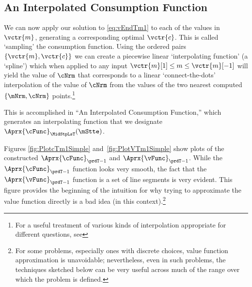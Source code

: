 \documentclass[\econtexRoot/SolvingMicroDSOPs]{subfiles}
\begin{document}


\hypertarget{an-interpolated-consumption-function}{}
\subsection{An Interpolated Consumption Function} \label{subsec:LinInterp}

We can now apply our solution to \eqref{eq:vEndTm1} to each of the values in $\vctr{m}$, generating a corresponding optimal $\vctr{c}$.  This is called `sampling' the consumption function.  Using the ordered pairs $\{\vctr{m},\vctr{c}\}$ we can create a piecewise linear `interpolating function' (a `spline') which when applied to any input $\vctr{m}[1] \leq {m} \leq \vctr{m}[-1]$ will yield the value of $\cNrm$ that corresponds to a linear `connect-the-dots' interpolation of the value of $\cNrm$ from the values of the two nearest computed $\{\mNrm,\cNrm\}$ points.\footnote{For a useful treatment of various kinds of interpolation appropriate for different questions, see } %

This is accomplished in ``An Interpolated Consumption Function,'' which generates an interpolating function that we designate $\Aprx{\cFunc}_{\MidStpLsT}(\mStte)$. %

Figures \ref{fig:PlotcTm1Simple} and~\ref{fig:PlotVTm1Simple} show
plots of the constructed $\Aprx{\cFunc}_{\prdT-1}$ and $\Aprx{\vFunc}_{\prdT-1}$. While the $\Aprx{\cFunc}_{\prdT-1}$ function looks very smooth, the fact that the $\Aprx{\vFunc}_{\prdT-1}$ function is a set of line segments is very evident.  This figure provides the beginning of the intuition for why trying to approximate the value function directly is a bad idea (in this context).\footnote{For some problems, especially ones with discrete choices, value function approximation is unavoidable; nevertheless, even in such problems, the techniques sketched below can be very useful across much of the range over which the problem is defined.}
\end{document}
